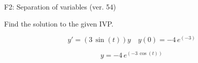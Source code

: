 \begin{exercise}
  \begin{exerciseTitle}F2: Separation of variables (ver. 54)\end{exerciseTitle}
  \begin{exerciseStatement}
    
Find the solution to the given IVP.

    
\[y'=( 3 \, \sin\left(t\right) )y\hspace{1em} y(0)= -4 \, e^{\left(-3\right)}\]

  \end{exerciseStatement}
  \begin{exerciseAnswer}
    
\[y= -4 \, e^{\left(-3 \, \cos\left(t\right)\right)}\]

  \end{exerciseAnswer}
\end{exercise}